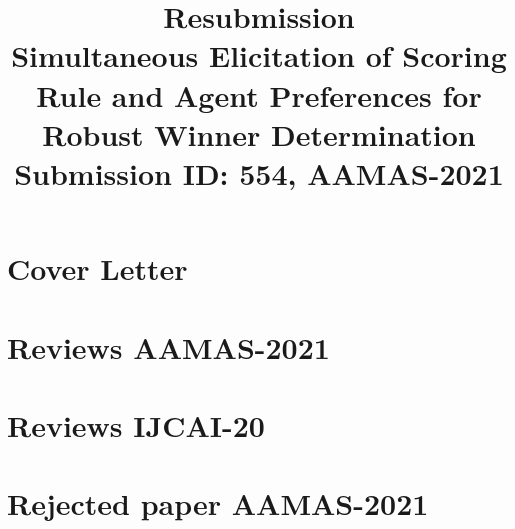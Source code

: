 \documentclass[a4paper]{article}
\date{}
\title{Resubmission \\ \vspace{1cm} \textbf{\Large Simultaneous Elicitation of Scoring Rule and Agent Preferences for Robust Winner Determination} \\ {\large Submission ID: 554, AAMAS-2021}}
\begin{document}
\maketitle

\section{Cover Letter}


\section{Reviews AAMAS-2021}


\section{Reviews IJCAI-20}


\section{Rejected paper AAMAS-2021}

\end{document}
